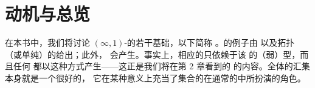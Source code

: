 \section*{动机与总览}

在本书中，我们将讨论 $(\infty,1)$-\trCategories{}的若干基础，以下简称%
\trInfinityCategories{}。\trInfinityCategories{}的例子由\trOrdinaryCategory{}%
以及拓扑（或单纯）\trEnrichment{}的\trCategories{}给出；此外，\trTopologicalSpace{}%
会产生\trInfinityGroupoid{}。事实上，相应的\trInfinityGroupoid{}只依赖于该%
\trTopologicalSpace{}的（弱）\trHomotopy{}型，而且任何\trInfinityGroupoid{}%
都以这种方式产生——这正是我们将在第 2 章看到的\trHomotopyHypothesis{}%
的内容。全体\trInfinityGroupoid{}的汇集本身就是一个很好的\trInfinityCategory{}，
它在某种意义上充当了集合的\trCategory{}在通常的\trCategoryTheory{}中所扮演的角色。

